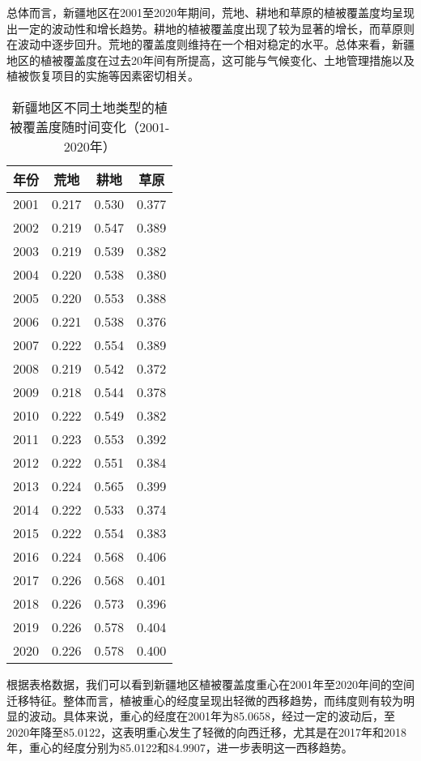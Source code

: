 \documentclass[AutoFakeBold]{LZUThesis-PgD&PhD}
\begin{document}
    总体而言，新疆地区在2001至2020年期间，荒地、耕地和草原的植被覆盖度均呈现出一定的波动性和增长趋势。耕地的植被覆盖度出现了较为显著的增长，而草原则在波动中逐步回升。荒地的覆盖度则维持在一个相对稳定的水平。总体来看，新疆地区的植被覆盖度在过去20年间有所提高，这可能与气候变化、土地管理措施以及植被恢复项目的实施等因素密切相关。
    \begin{table}[H]
        \centering
        \begin{tabular}{|c|c|c|c|}
            \hline
            \textbf{年份} & \textbf{荒地} & \textbf{耕地} & \textbf{草原} \\
            \hline
            2001 & 0.217 & 0.530 & 0.377 \\
            2002 & 0.219 & 0.547 & 0.389 \\
            2003 & 0.219 & 0.539 & 0.382 \\
            2004 & 0.220 & 0.538 & 0.380 \\
            2005 & 0.220 & 0.553 & 0.388 \\
            2006 & 0.221 & 0.538 & 0.376 \\
            2007 & 0.222 & 0.554 & 0.389 \\
            2008 & 0.219 & 0.542 & 0.372 \\
            2009 & 0.218 & 0.544 & 0.378 \\
            2010 & 0.222 & 0.549 & 0.382 \\
            2011 & 0.223 & 0.553 & 0.392 \\
            2012 & 0.222 & 0.551 & 0.384 \\
            2013 & 0.224 & 0.565 & 0.399 \\
            2014 & 0.222 & 0.533 & 0.374 \\
            2015 & 0.222 & 0.554 & 0.383 \\
            2016 & 0.224 & 0.568 & 0.406 \\
            2017 & 0.226 & 0.568 & 0.401 \\
            2018 & 0.226 & 0.573 & 0.396 \\
            2019 & 0.226 & 0.578 & 0.404 \\
            2020 & 0.226 & 0.578 & 0.400 \\
            \hline
        \end{tabular}
        \caption{新疆地区不同土地类型的植被覆盖度随时间变化（2001-2020年）}
    \end{table}

    
\par
    根据表格数据，我们可以看到新疆地区植被覆盖度重心在2001年至2020年间的空间迁移特征。整体而言，植被重心的经度呈现出轻微的西移趋势，而纬度则有较为明显的波动。具体来说，重心的经度在2001年为85.0658，经过一定的波动后，至2020年降至85.0122，这表明重心发生了轻微的向西迁移，尤其是在2017年和2018年，重心的经度分别为85.0122和84.9907，进一步表明这一西移趋势。
    
\end{document}
